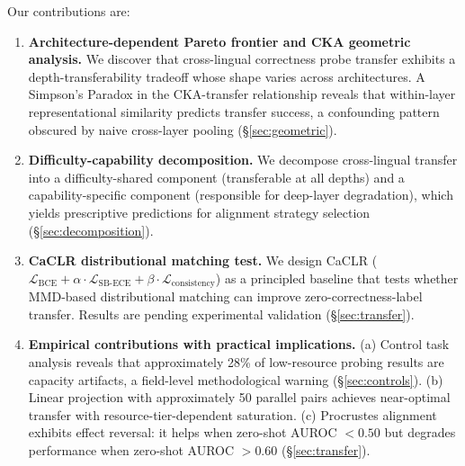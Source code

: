 Our contributions are:
\begin{enumerate}
\item \textbf{Architecture-dependent Pareto frontier and CKA geometric analysis.} We discover that cross-lingual correctness probe transfer exhibits a depth-transferability tradeoff whose shape varies across architectures. A Simpson's Paradox in the CKA-transfer relationship reveals that within-layer representational similarity predicts transfer success, a confounding pattern obscured by naive cross-layer pooling (\S\ref{sec:geometric}).

\item \textbf{Difficulty-capability decomposition.} We decompose cross-lingual transfer into a difficulty-shared component (transferable at all depths) and a capability-specific component (responsible for deep-layer degradation), which yields prescriptive predictions for alignment strategy selection (\S\ref{sec:decomposition}).

\item \textbf{CaCLR distributional matching test.} We design CaCLR ($\mathcal{L}_{\text{BCE}} + \alpha \cdot \mathcal{L}_{\text{SB-ECE}} + \beta \cdot \mathcal{L}_{\text{consistency}}$) as a principled baseline that tests whether MMD-based distributional matching can improve zero-correctness-label transfer. Results are pending experimental validation (\S\ref{sec:transfer}).

\item \textbf{Empirical contributions with practical implications.} (a) Control task analysis reveals that approximately 28\% of low-resource probing results are capacity artifacts, a field-level methodological warning (\S\ref{sec:controls}). (b) Linear projection with approximately 50 parallel pairs achieves near-optimal transfer with resource-tier-dependent saturation. (c) Procrustes alignment exhibits effect reversal: it helps when zero-shot AUROC $< 0.50$ but degrades performance when zero-shot AUROC $> 0.60$ (\S\ref{sec:transfer}).
\end{enumerate}
